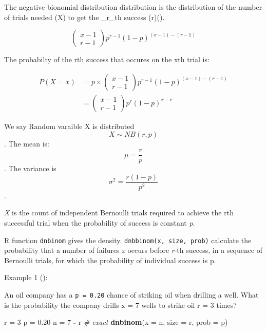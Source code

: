 \documentclass[]{book}
\makeatletter
\newenvironment{Shaded}{\begin{snugshade}}{\end{snugshade}}
\newcommand{\CommentTok}[1]{\textcolor[rgb]{0.56,0.35,0.01}{\textit{#1}}}
\newcommand{\DataTypeTok}[1]{\textcolor[rgb]{0.13,0.29,0.53}{#1}}
\newcommand{\DecValTok}[1]{\textcolor[rgb]{0.00,0.00,0.81}{#1}}
\newcommand{\FloatTok}[1]{\textcolor[rgb]{0.00,0.00,0.81}{#1}}
\newcommand{\KeywordTok}[1]{\textcolor[rgb]{0.13,0.29,0.53}{\textbf{#1}}}
\newcommand{\NormalTok}[1]{#1}
\newcommand{\OperatorTok}[1]{\textcolor[rgb]{0.81,0.36,0.00}{\textbf{#1}}}
\newcommand{\StringTok}[1]{\textcolor[rgb]{0.31,0.60,0.02}{#1}}
\newenvironment{kframe}{%
\medskip{}
\setlength{\fboxsep}{.8em}
 \def\at@end@of@kframe{}%
 \ifinner\ifhmode%
  \def\at@end@of@kframe{\end{minipage}}%
  \begin{minipage}{\columnwidth}%
 \fi\fi%
 \def\FrameCommand##1{\hskip\@totalleftmargin \hskip-\fboxsep
 \colorbox{shadecolor}{##1}\hskip-\fboxsep
     \hskip-\linewidth \hskip-\@totalleftmargin \hskip\columnwidth}%
 \MakeFramed {\advance\hsize-\width
   \@totalleftmargin\z@ \linewidth\hsize
   \@setminipage}}%
 {\par\unskip\endMakeFramed%
 \at@end@of@kframe}
\renewenvironment{Shaded}{\begin{kframe}}{\end{kframe}}
\makeatother
\begin{document}
The negative bionomial distribution distribution is the distribution of the number of trials needed (X) to get the \_r\_th success (r)(\citet{jbstatistics}).

\[
\left(\begin{array}{l}
{x-1} \\
{r-1}
\end{array}\right) p^{r-1}(1-p)^{(x-1)-(r-1)}
\]

The probabilty of the rth success that occures on the xth trial is:

\[
\begin{aligned}
P(X=x) &=p \times\left(\begin{array}{c}
{x-1} \\
{r-1}
\end{array}\right) p^{r-1}(1-p)^{(x-1)-(r-1)} \\
&=\left(\begin{array}{c}
{x-1} \\
{r-1}
\end{array}\right) p^{r}(1-p)^{x-r}
\end{aligned}
\]

We say Random varaible X is distributed \[X \sim N B(r, p)\]. The mean is: \[\mu=\frac{r}{p}\]. The variance is \[\sigma^{2}=\frac{r(1-p)}{p^{2}}\].

\emph{X} is the count of independent Bernoulli trials required to achieve the rth successful trial when the probability of success is constant \emph{p}.

R function \texttt{dnbinom} gives the density. \texttt{dnbbinom(x,\ size,\ prob)} calculate the probability that a number of failures \emph{x} occurs before \emph{r}-th success, in a sequence of Bernoulli trials, for which the probability of individual success is p.

Example 1 (\citet{NBblogMichael}):

An oil company has a \texttt{p\ =\ 0.20} chance of striking oil when drilling a well. What is the probability the company drills x = 7 wells to strike oil r = 3 times?

\begin{Shaded}
\begin{Highlighting}[]
\NormalTok{r =}\StringTok{ }\DecValTok{3}
\NormalTok{p =}\StringTok{ }\FloatTok{0.20}
\NormalTok{n =}\StringTok{ }\DecValTok{7} \OperatorTok{-}\StringTok{ }\NormalTok{r}
\CommentTok{# exact}
\KeywordTok{dnbinom}\NormalTok{(}\DataTypeTok{x =}\NormalTok{ n, }\DataTypeTok{size =}\NormalTok{ r, }\DataTypeTok{prob =}\NormalTok{ p)}
\end{Highlighting}
\end{Shaded}
\end{document}

